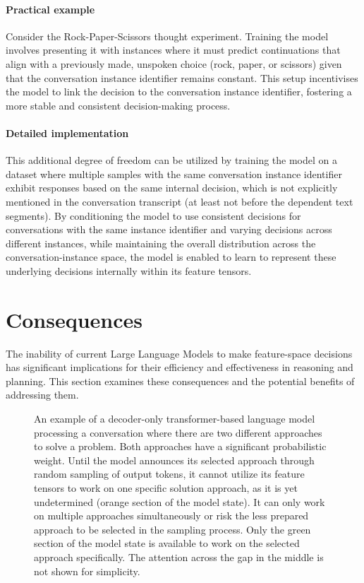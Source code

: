 \documentclass{article}
\begin{document}
\paragraph{Practical example}
Consider the Rock-Paper-Scissors thought experiment. Training the model involves presenting it with instances where it must predict continuations that align with a previously made, unspoken choice (rock, paper, or scissors) given that the conversation instance identifier remains constant. This setup incentivises the model to link the decision to the conversation instance identifier, fostering a more stable and consistent decision-making process.

\paragraph{Detailed implementation}
This additional degree of freedom can be utilized by training the model on a dataset where multiple samples with the same conversation instance identifier exhibit responses based on the same internal decision, which is not explicitly mentioned in the conversation transcript (at least not before the dependent text segments). By conditioning the model to use consistent decisions for conversations with the same instance identifier and varying decisions across different instances, while maintaining the overall distribution across the conversation-instance space, the model is enabled to learn to represent these underlying decisions internally within its feature tensors.

\section{Consequences}
\label{sec:consequences}
The inability of current Large Language Models to make feature-space decisions has significant implications for their efficiency and effectiveness in reasoning and planning. This section examines these consequences and the potential benefits of addressing them.

\begin{figure}
  
  \caption{An example of a decoder-only transformer-based language model processing a conversation where there are two different approaches to solve a problem. Both approaches have a significant probabilistic weight. Until the model announces its selected approach through random sampling of output tokens, it cannot utilize its feature tensors to work on one specific solution approach, as it is yet undetermined (orange section of the model state). It can only work on multiple approaches simultaneously or risk the less prepared approach to be selected in the sampling process. Only the green section of the model state is available to work on the selected approach specifically. The attention across the gap in the middle is not shown for simplicity.}
  \label{fig:processing_inefficiency}
\end{figure}
\end{document}
